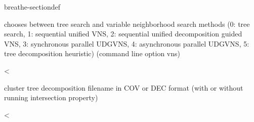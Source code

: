 \documentclass[letterpaper,10pt,openany,oneside,english]{sphinxmanual}
\begin{document}
\begin{fulllineitems}
\begin{sphinxuseclass}{breathe-sectiondef}
\begin{fulllineitems}
\sphinxAtStartPar
chooses between tree search and variable neighborhood search methods (0: tree search, 1: sequential unified VNS, 2: sequential unified decomposition guided VNS, 3: synchronous parallel UDGVNS, 4: asynchronous parallel UDGVNS, 5: tree decomposition heuristic) (command line option \sphinxhyphen{}vns) 

\end{fulllineitems}


\begin{fulllineitems}
\label{\detokenize{ref/ref_cpp:_CPPv4N8ToulBar29vnsOutputE}}\label{\detokenize{ref/ref_cpp:_CPPv3N8ToulBar29vnsOutputE}}\label{\detokenize{ref/ref_cpp:_CPPv2N8ToulBar29vnsOutputE}}\label{\detokenize{ref/ref_cpp:ToulBar2::vnsOutput__ofstream}}
\pysigstartsignatures
\pysigstartmultiline
{}
\pysigstopmultiline
\pysigstopsignatures
\sphinxAtStartPar
\textless{} 

\sphinxAtStartPar
cluster tree decomposition filename in COV or DEC format (with or without running intersection property) 

\end{fulllineitems}


\begin{fulllineitems}
\label{\detokenize{ref/ref_cpp:_CPPv4N8ToulBar210vnsInitSolE}}\label{\detokenize{ref/ref_cpp:_CPPv3N8ToulBar210vnsInitSolE}}\label{\detokenize{ref/ref_cpp:_CPPv2N8ToulBar210vnsInitSolE}}\label{\detokenize{ref/ref_cpp:ToulBar2::vnsInitSol__VNSSolutionInitMethod}}
\pysigstartsignatures
\pysigstartmultiline
{}
\pysigstopmultiline
\pysigstopsignatures
\sphinxAtStartPar
\textless{} 

\end{fulllineitems}


\end{sphinxuseclass}
\end{fulllineitems}
\end{document}
